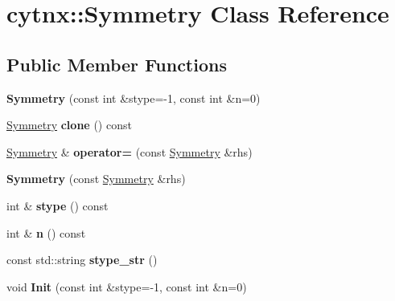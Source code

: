 \hypertarget{classcytnx_1_1Symmetry}{}\section{cytnx\+:\+:Symmetry Class Reference}
\label{classcytnx_1_1Symmetry}
\subsection*{Public Member Functions}
\begin{DoxyCompactItemize}
\item 
\mbox{\label{classcytnx_1_1Symmetry_a6f867aa12315130eee0cde8d78ad1932}} 
{\bfseries Symmetry} (const int \&stype=-\/1, const int \&n=0)
\item 
\mbox{\label{classcytnx_1_1Symmetry_a2b407bcad5cdad20edddffeeda6befe7}} 
\hyperlink{classcytnx_1_1Symmetry}{Symmetry} {\bfseries clone} () const
\item 
\mbox{\label{classcytnx_1_1Symmetry_a56e1acd0f2819a76dc1ecebd5fc5f68b}} 
\hyperlink{classcytnx_1_1Symmetry}{Symmetry} \& {\bfseries operator=} (const \hyperlink{classcytnx_1_1Symmetry}{Symmetry} \&rhs)
\item 
\mbox{\label{classcytnx_1_1Symmetry_ade26a3064b4b1db5b9d7e5ad367b9150}} 
{\bfseries Symmetry} (const \hyperlink{classcytnx_1_1Symmetry}{Symmetry} \&rhs)
\item 
\mbox{\label{classcytnx_1_1Symmetry_ae1f07ee701371e161a6873230fe2f331}} 
int \& {\bfseries stype} () const
\item 
\mbox{\label{classcytnx_1_1Symmetry_a7da9fe0ac39f231e35fa087ac186219a}} 
int \& {\bfseries n} () const
\item 
\mbox{\label{classcytnx_1_1Symmetry_a42f9e6b967e1b02a394cb731d014eb7e}} 
const std\+::string {\bfseries stype\+\_\+str} ()
\item 
\mbox{\label{classcytnx_1_1Symmetry_a173cf2290a246fd6474532ede50e1c89}} 
void {\bfseries Init} (const int \&stype=-\/1, const int \&n=0)

\end{DoxyCompactItemize}
